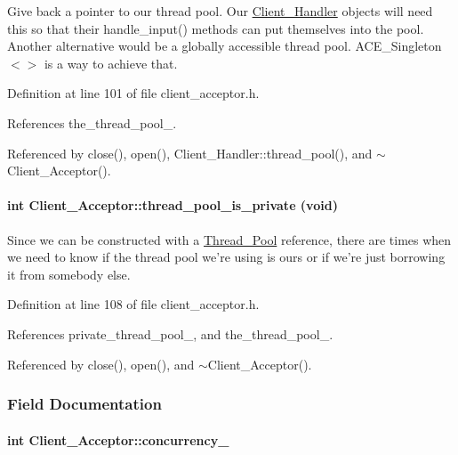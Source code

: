 Give back a pointer to our thread pool. Our \hyperlink{classClient__Handler}{Client\_\-Handler} objects will need this so that their handle\_\-input() methods can put themselves into the pool. Another alternative would be a globally accessible thread pool. ACE\_\-Singleton$<$$>$ is a way to achieve that. 

Definition at line 101 of file client\_\-acceptor.h.

References the\_\-thread\_\-pool\_\-.

Referenced by close(), open(), Client\_\-Handler::thread\_\-pool(), and $\sim$Client\_\-Acceptor().\hypertarget{classClient__Acceptor_Client__Acceptora7}{
\paragraph[thread\_\-pool\_\-is\_\-private]{\setlength{\rightskip}{0pt plus 5cm}int Client\_\-Acceptor::thread\_\-pool\_\-is\_\-private (void)}\hfill}
\label{classClient__Acceptor_Client__Acceptora7}


Since we can be constructed with a \hyperlink{classThread__Pool}{Thread\_\-Pool} reference, there are times when we need to know if the thread pool we're using is ours or if we're just borrowing it from somebody else. 

Definition at line 108 of file client\_\-acceptor.h.

References private\_\-thread\_\-pool\_\-, and the\_\-thread\_\-pool\_\-.

Referenced by close(), open(), and $\sim$Client\_\-Acceptor().

\subsubsection{Field Documentation}
\hypertarget{classClient__Acceptor_Client__Acceptorn0}{
\paragraph[concurrency\_\-]{\setlength{\rightskip}{0pt plus 5cm}int Client\_\-Acceptor::concurrency\_\-}\hfill}
\label{classClient__Acceptor_Client__Acceptorn0}




